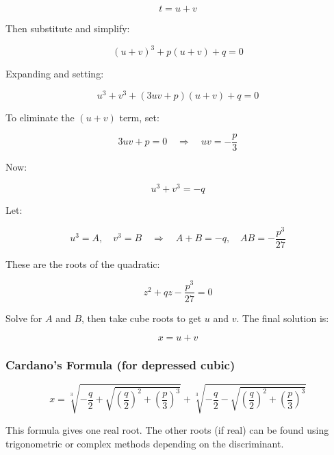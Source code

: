 \[
    t = u + v
\]

Then substitute and simplify:

\[
    {(u+v)}^3 + p(u+v) + q = 0
\]

Expanding and setting:

\[
    u^3 + v^3 + (3uv + p)(u+v) + q = 0
\]

To eliminate the \((u+v)\) term, set:

\[
    3uv + p = 0 \quad \Rightarrow \quad uv = -\frac{p}{3}
\]

Now:

\[
    u^3 + v^3 = -q
\]

Let:

\[
    u^3 = A, \quad v^3 = B \quad \Rightarrow \quad A + B = -q, \quad AB = -\frac{p^3}{27}
\]

These are the roots of the quadratic:

\[
    z^2 + qz - \frac{p^3}{27} = 0
\]

Solve for \(A\) and \(B\), then take cube roots to get \(u\) and \(v\). The final solution is:

\[
    x = u + v
\]

\subsubsection{Cardano’s Formula (for depressed cubic)}

\[
    x = \sqrt[3]{-\frac{q}{2} + \sqrt{{\left(\frac{q}{2}\right)}^2 + {\left(\frac{p}{3}\right)}^3}} + \sqrt[3]{-\frac{q}{2} - \sqrt{{\left(\frac{q}{2}\right)}^2 + {\left(\frac{p}{3}\right)}^3}}
\]

This formula gives one real root. The other roots (if real) can be found using trigonometric or complex methods depending on the discriminant.

